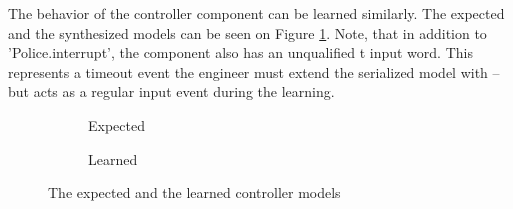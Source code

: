 The behavior of the controller component can be learned similarly. The expected and the synthesized models can be seen on Figure \ref{fig_casestudy_controllerdiff}. Note, that in addition to '{\selectfont Police.interrupt}', the component also has an unqualified t input word. This represents a timeout event the engineer must extend the serialized model with -- but acts as a regular input event during the learning. 

\begin{figure}[!ht] 
	\centering
	\begin{subfigure}[b]{0.9\textwidth}
		\centering
		\caption{Expected}
	\end{subfigure}
	\hfill
	\begin{subfigure}[b]{0.9\textwidth}
		\centering
		\caption{Learned}	
	\end{subfigure}
	\caption{The expected and the learned controller models}
	\label{fig_casestudy_controllerdiff}
\end{figure}

